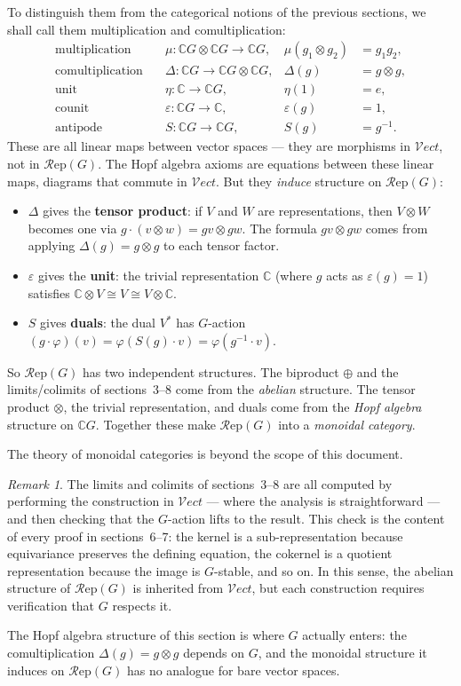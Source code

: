 \documentclass[12pt,a4paper]{article}
\theoremstyle{definition}
\theoremstyle{remark}
\newtheorem{remark}[theorem]{Remark}
\newcommand{\C}{\mathbb{C}}
\newcommand{\Rep}{\mathcal{R}\mathrm{ep}}
\newcommand{\Vect}{\mathcal{V}\!\mathit{ect}}
\begin{document}
To distinguish them from the categorical notions of the previous sections, we
shall call them multiplication and comultiplication:
\begin{align*}
\text{multiplication} \quad &\mu\colon \C G \otimes \C G \to \C G, & \mu(g_1 \otimes g_2) &= g_1 g_2, \\
\text{comultiplication} \quad &\Delta\colon \C G \to \C G \otimes \C G, & \Delta(g) &= g \otimes g, \\
\text{unit} \quad &\eta\colon \C \to \C G, & \eta(1) &= e, \\
\text{counit} \quad &\varepsilon\colon \C G \to \C, & \varepsilon(g) &= 1, \\
\text{antipode} \quad &S\colon \C G \to \C G, & S(g) &= g^{-1}.
\end{align*}
These are all linear maps between vector spaces --- they are morphisms in $\Vect$,
not in $\Rep(G)$. The Hopf algebra axioms are equations between these linear maps,
diagrams that commute in $\Vect$. But they \emph{induce} structure on $\Rep(G)$:
\begin{itemize}
\item $\Delta$ gives the \textbf{tensor product}: if $V$ and $W$ are representations,
  then $V \otimes W$ becomes one via $g \cdot (v \otimes w) = gv \otimes gw$.
  The formula $gv \otimes gw$ comes from applying $\Delta(g) = g \otimes g$ to each
  tensor factor.
\item $\varepsilon$ gives the \textbf{unit}: the trivial representation $\C$
  (where $g$ acts as $\varepsilon(g) = 1$) satisfies $\C \otimes V \cong V \cong
  V \otimes \C$.
\item $S$ gives \textbf{duals}: the dual $V^*$ has $G$-action
  $(g \cdot \varphi)(v) = \varphi(S(g) \cdot v) = \varphi(g^{-1} \cdot v)$.
\end{itemize}
So $\Rep(G)$ has two independent structures. The biproduct $\oplus$ and the
limits/colimits of sections~3--8 come from the \emph{abelian} structure.
The tensor product $\otimes$, the trivial representation, and duals come from
the \emph{Hopf algebra} structure on $\C G$. Together these make $\Rep(G)$
into a \emph{monoidal category}.

The theory of monoidal categories is beyond the scope of this document.

\begin{remark}
The limits and colimits of sections~3--8 are all computed by performing the
construction in $\Vect$ --- where the analysis is straightforward --- and then
checking that the $G$-action lifts to the result. This check is the content of
every proof in sections~6--7: the kernel is a sub-representation because
equivariance preserves the defining equation, the cokernel is a quotient
representation because the image is $G$-stable, and so on. In this sense, the
abelian structure of $\Rep(G)$ is inherited from $\Vect$, but each construction
requires verification that $G$ respects it.

The Hopf algebra structure of this section is where $G$ actually enters: the
comultiplication $\Delta(g) = g \otimes g$ depends on $G$, and the monoidal
structure it induces on $\Rep(G)$ has no analogue for bare vector spaces.
\end{remark}
\end{document}
